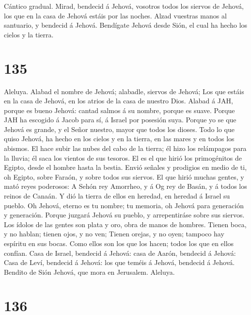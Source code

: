  Cántico gradual. Mirad, bendecid á Jehová, vosotros todos
los siervos de Jehová, los que en la casa de Jehová estáis por las
noches.  Alzad vuestras manos al santuario, y bendecid á
Jehová.  Bendígate Jehová desde Sión, el cual ha hecho los
cielos y la tierra.

\hypertarget{section-134}{%
\section{135}\label{section-134}}

 Aleluya. Alabad el nombre de Jehová; alabadle, siervos de
Jehová;  Los que estáis en la casa de Jehová, en los
atrios de la casa de nuestro Dios.  Alabad á JAH, porque
es bueno Jehová: cantad salmos á su nombre, porque es suave.
 Porque JAH ha escogido á Jacob para sí, á Israel por
posesión suya.  Porque yo se que Jehová es grande, y el
Señor nuestro, mayor que todos los dioses.  Todo lo que
quiso Jehová, ha hecho en los cielos y en la tierra, en las mares y en
todos los abismos.  El hace subir las nubes del cabo de la
tierra; él hizo los relámpagos para la lluvia; él saca los vientos de
sus tesoros.  El es el que hirió los primogénitos de
Egipto, desde el hombre hasta la bestia.  Envió señales y
prodigios en medio de ti, oh Egipto, sobre Faraón, y sobre todos sus
siervos.  El que hirió muchas gentes, y mató reyes
poderosos:  A Sehón rey Amorrheo, y á Og rey de Basán, y
á todos los reinos de Canaán.  Y dió la tierra de ellos
en heredad, en heredad á Israel su pueblo.  Oh Jehová,
eterno es tu nombre; tu memoria, oh Jehová para generación y generación.
 Porque juzgará Jehová su pueblo, y arrepentiráse sobre
sus siervos.  Los ídolos de las gentes son plata y oro,
obra de manos de hombres.  Tienen boca, y no hablan;
tienen ojos, y no ven;  Tienen orejas, y no oyen; tampoco
hay espíritu en sus bocas.  Como ellos son los que los
hacen; todos los que en ellos confían.  Casa de Israel,
bendecid á Jehová: casa de Aarón, bendecid á Jehová: 
Casa de Leví, bendecid á Jehová: los que teméis á Jehová, bendecid á
Jehová.  Bendito de Sión Jehová, que mora en Jerusalem.
Aleluya.

\hypertarget{section-135}{%
\section{136}\label{section-135}}

